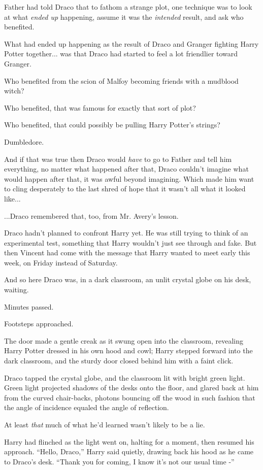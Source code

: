 Father had told Draco that to fathom a strange plot, one technique was
to look at what \emph{ended up} happening, assume it was the
\emph{intended} result, and ask who benefited.

What had ended up happening as the result of Draco and Granger fighting
Harry Potter together... was that Draco had started to feel a lot
friendlier toward Granger.

Who benefited from the scion of Malfoy becoming friends with a mudblood
witch?

Who benefited, that was famous for exactly that sort of plot?

Who benefited, that could possibly be pulling Harry Potter's strings?

Dumbledore.

And if that was true then Draco would \emph{have} to go to Father and
tell him everything, no matter what happened after that, Draco couldn't
imagine what would happen after that, it was awful beyond imagining.
Which made him want to cling desperately to the last shred of hope that
it wasn't all what it looked like...

...Draco remembered that, too, from Mr. Avery's lesson.

Draco hadn't planned to confront Harry yet. He was still trying to think
of an experimental test, something that Harry wouldn't just see through
and fake. But then Vincent had come with the message that Harry wanted
to meet early this week, on Friday instead of Saturday.

And so here Draco was, in a dark classroom, an unlit crystal globe on
his desk, waiting.

Minutes passed.

Footsteps approached.

The door made a gentle creak as it swung open into the classroom,
revealing Harry Potter dressed in his own hood and cowl; Harry stepped
forward into the dark classroom, and the sturdy door closed behind him
with a faint click.

Draco tapped the crystal globe, and the classroom lit with bright green
light. Green light projected shadows of the desks onto the floor, and
glared back at him from the curved chair-backs, photons bouncing off the
wood in such fashion that the angle of incidence equaled the angle of
reflection.

At least \emph{that} much of what he'd learned wasn't likely to be a
lie.

Harry had flinched as the light went on, halting for a moment, then
resumed his approach. ``Hello, Draco,'' Harry said quietly, drawing back
his hood as he came to Draco's desk. ``Thank you for coming, I know it's
not our usual time -''

